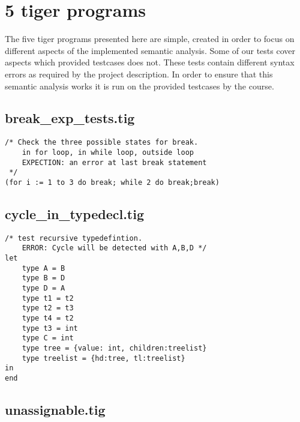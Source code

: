 \documentclass{article}
\begin{document}
\section{5 tiger programs}

The five tiger programs presented here are simple, created in order to focus on different aspects of the implemented semantic analysis. Some of our tests cover aspects
which provided testcases does not. These tests contain different syntax errors as required by the project description. In order to ensure that this semantic analysis works it is run on the provided testcases by the course. 



\subsection{break\_exp\_tests.tig}

\begin{lstlisting}[frame=single]
/* Check the three possible states for break.
	in for loop, in while loop, outside loop
	EXPECTION: an error at last break statement
 */
(for i := 1 to 3 do break; while 2 do break;break)
\end{lstlisting}

\subsection{cycle\_in\_typedecl.tig}

\begin{lstlisting}[frame=single]
/* test recursive typedefintion.
	ERROR: Cycle will be detected with A,B,D */
let
	type A = B
	type B = D
	type D = A
	type t1 = t2
	type t2 = t3
	type t4 = t2
	type t3 = int
	type C = int
	type tree = {value: int, children:treelist}
	type treelist = {hd:tree, tl:treelist}
in 
end
\end{lstlisting}

\subsection{unassignable.tig}
\end{document}
